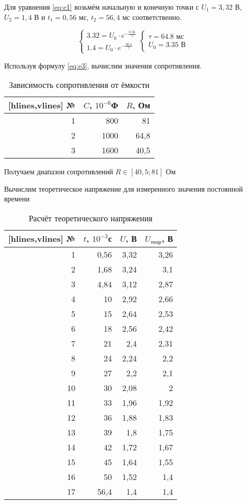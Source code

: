 Для уравнения \eqref{eq:e1} возьмём начальную и конечную точки с $U_1=3,32$ В, $U_2=1,4$ В и $t_1=0,56$ мс, $t_2=56,4$ мс соответственно.

\begin{equation*}
    \begin{cases}
        3.32 = U_0 \cdot e^{-\frac{0.56}{\tau}}\\
        1.4 = U_0 \cdot e^{-\frac{56.4}{\tau}}
    \end{cases}
    \begin{cases}
        \tau = 64.8 \text{ мс}\\
        U_0=3.35 \text{ В}
    \end{cases}
\end{equation*}

Используя формулу \eqref{eq:e3}, вычислим значения сопротивления.
\begin{table}[H]
    \caption{Зависимость сопротивления от ёмкости}
\label{tab:t1}
\centering
 \begin{NiceTabular*}{\linewidth}{@{\extracolsep{\fill}}rrr}[hlines,vlines]
№ & $C$, $10^{-6}$Ф & $R$, Ом \\
 & 800 & 81 \\
2 & 1000 & 64,8 \\
3 & 1600 & 40,5 \\
\end{NiceTabular*}
\end{table}

Получаем диапазон сопротивлений $R \in \left[ 40,5; 81\right]$ Ом

Вычислим теоретическое напряжение для измеренного значения постоянной времени

\begin{table}[H]
    \caption{Расчёт теоретического напряжения}
\label{tab:t1}
\centering
 \begin{NiceTabular*}{\linewidth}{@{\extracolsep{\fill}}rrrr}[hlines,vlines]
№ & $t$, $10^{-3}$с & $U$, В & $U_{\text{теор}}$, В\\
 & 0,56 & 3,32 & 3,26 \\
2 & 1,68 & 3,24 & 3,1 \\
3 & 4,84 & 3,12 & 2,87 \\
4 & 10 & 2,92 & 2,66 \\
5 & 15 & 2,64 & 2,53 \\
6 & 18 & 2,56 & 2,42 \\
7 & 21 & 2,4 & 2,31 \\
8 & 24 & 2,24 & 2,2 \\
9 & 27 & 2,2 & 2,1 \\
10 & 30 & 2,08 & 2 \\
11 & 33 & 1,96 & 1,92 \\
12 & 36 & 1,88 & 1,83 \\
13 & 39 & 1,8 & 1,75 \\
14 & 42 & 1,72 & 1,67 \\
15 & 45 & 1,64 & 1,55 \\
16 & 50 & 1,52 & 1,4 \\
17 & 56,4 & 1,4 & 1,4\\
\end{NiceTabular*}
\end{table}

